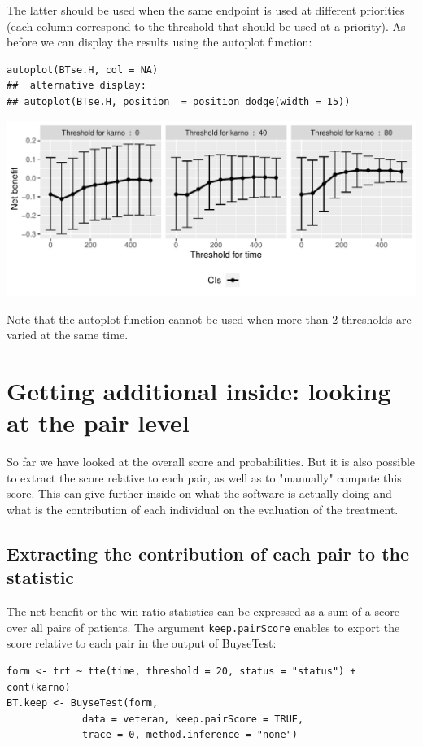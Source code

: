 \documentclass[12pt]{article}
\begin{document}
The latter should be used when the same endpoint is used at different
priorities (each column correspond to the threshold that should be
used at a priority). As before we can display the results using the
autoplot function:
\lstset{language=r,label= ,caption= ,captionpos=b,numbers=none}
\begin{lstlisting}
autoplot(BTse.H, col = NA)
##  alternative display:
## autoplot(BTse.H, position  = position_dodge(width = 15))
\end{lstlisting}

\begin{center}
\includegraphics[width=\textwidth]{./figures/gg-sensitivity2.pdf}
\end{center}

Note that the autoplot function cannot be used when more than 2
thresholds are varied at the same time.

\section{Getting additional inside: looking at the pair level}
\label{sec:org4545d45}

So far we have looked at the overall score and probabilities. But it
is also possible to extract the score relative to each pair, as well
as to "manually" compute this score. This can give further inside on
what the software is actually doing and what is the contribution of
each individual on the evaluation of the treatment.

\subsection{Extracting the contribution of each pair to the statistic}
\label{sec:orgda5f4a6}
The net benefit or the win ratio statistics can be expressed as a sum
of a score over all pairs of patients. The argument \texttt{keep.pairScore}
enables to export the score relative to each pair in the output of
BuyseTest:
\lstset{language=r,label= ,caption= ,captionpos=b,numbers=none}
\begin{lstlisting}
form <- trt ~ tte(time, threshold = 20, status = "status") + cont(karno)
BT.keep <- BuyseTest(form,
		     data = veteran, keep.pairScore = TRUE, 
		     trace = 0, method.inference = "none")
\end{lstlisting}
\end{document}
